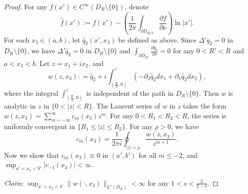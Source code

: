 \documentclass[10pt,a4paper]{amsart}
\begin{document}
\begin{proof}
	For any $f(x')\in C^{\infty}(D_R\setminus\{0\})$, denote 
	\begin{equation}\label{eq:lem:2_2:pf:5}
		\hat{f}(x'):=f(x')-\left(\frac{1}{2\pi}\int_{\partial D_{R/2}}\frac{\partial f}{\partial \nu}\right)\ln |x'|.
	\end{equation}
	For each $x_3\in (a, b)$, let $\hat{q}_2(x', x_3)$ be defined as above. Since $\Delta' q_2=0$ in $D_R\setminus\{0\}$, we have $\Delta' \hat{q}_2=0$ in $D_R\setminus\{0\}$ and $\int_{\partial D_{R'}}\frac{\partial \hat{q}_2}{\partial \nu}=0$ for any $0<R'<R$ and $a<x_3<b$. Let $z=x_1+ix_2$, and
	\[
		w(z, x_3): 
		=\hat{q}_2+i \int_{(\frac{R}{2}, 0)}^z(-\partial_2\hat{q}_2 dx_1+\partial_1\hat{q}_2dx_2), 
	\]
	where the integral $\int_{(\frac{R}{2}, 0)}^{z}$ is independent of the path in $D_R\setminus\{0\}$. 
	Then $w$ is analytic in $z$ in $\{0<|z|< R\}$. 
	The Laurent series of $w$ in $z$ takes the form $w(z, x_3)=\sum_{m=-\infty}^{\infty} c_m(x_3) z^m$. 
	For any $0<R_1<R_2<R$, the series is uniformly convergent in $\{ R_1\le |z|\le R_2\}$. For 
	any $\rho>0$, we have 
	\begin{equation}\label{eq:lem:2_2:pf:6}
		c_m(x_3)=\frac{1}{2\pi i}\oint_{|z|=\rho} \frac{w(z, x_3)}{z^{m+1}}. 
	\end{equation}
	Now we show that $c_m(x_3)\equiv 0$ in $(a', b')$ for all $m\le -2$, 
	and $\sup_{a'<x_3<b'}|c_{-1}(x_3)|<\infty$. 
	
	\noindent\emph{Claim}: 
	$\sup_{a'<x_3<b'} \|w(\cdot, x_3)\|_{L^{s}(D_{R})}<\infty$ for any $1<s<\frac{2}{2-\delta}$.
	

\end{proof}
\end{document}
